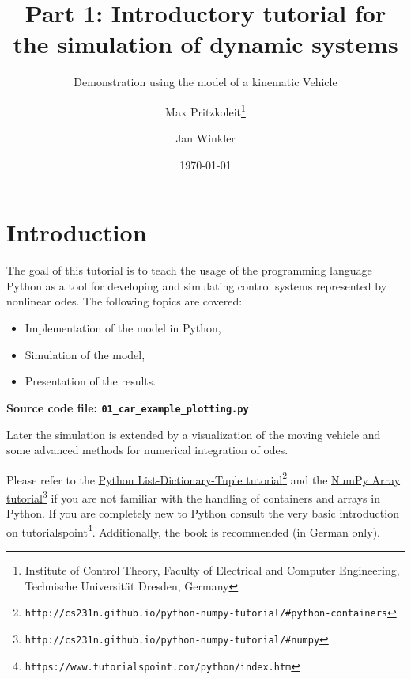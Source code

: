 \documentclass[a4paper,11pt,headinclude=true,headsepline,parskip=half,DIV=12]{scrartcl}
\title{Part 1: Introductory tutorial for the simulation of dynamic systems}
\subtitle{Demonstration using the model of a kinematic Vehicle}
\author{Max Pritzkoleit\thanks{Institute of Control Theory, Faculty of Electrical and Computer Engineering, Technische Universität Dresden, Germany} \and Jan Winkler\footnotemark[1]}
\date{\today}
\begin{document}
\maketitle




\tableofcontents

\newpage

\section{Introduction}
The goal of this tutorial is to teach the usage of the programming language Python as a tool for developing and simulating control systems  represented by nonlinear \glspl{ode}. The following topics are covered:
\begin{itemize}
\item Implementation of the model in Python,
\item Simulation of the model,
\item Presentation of the results.
\end{itemize}
\textbf{Source code file: \texttt{01\_car\_example\_plotting.py}}

Later the simulation is extended by a visualization of the moving vehicle and some advanced methods for numerical integration of \glspl{ode}.

Please refer to the \href{http://cs231n.github.io/python-numpy-tutorial/#python-containers}{Python List-Dictionary-Tuple tutorial}\footnote{\texttt{http://cs231n.github.io/python-numpy-tutorial/\#python-containers}} and the \href{http://cs231n.github.io/python-numpy-tutorial/#numpy}{NumPy Array tutorial}\footnote{\texttt{http://cs231n.github.io/python-numpy-tutorial/\#numpy}} if you are not familiar with the handling of containers and arrays in Python. If you are completely new to Python consult the very basic introduction on \href{https://www.tutorialspoint.com/python/index.htm}{tutorialspoint}\footnote{\texttt{https://www.tutorialspoint.com/python/index.htm}}. Additionally, the book \cite{KnollPython21} is recommended (in German only).
\end{document}

